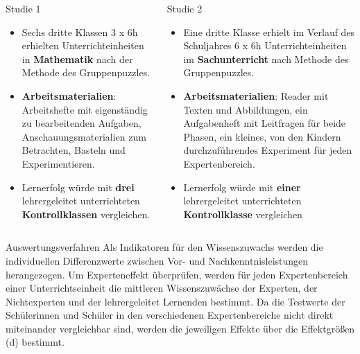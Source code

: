 \begin{columns}[t,totalwidth=\twocolwid]

\begin{column}{\onecolwid}\vspace{-.6in}
\begin{block}{Studie 1}
\begin{itemize}
\justifying
\item Sechs dritte Klassen 3 x 6h erhielten Unterrichteinheiten in \textbf{Mathematik} nach der Methode des Gruppenpuzzles.
\item \textbf{Arbeitsmaterialien}: Arbeitshefte mit eigenständig zu bearbeitenden Aufgaben, Anschauungsmaterialien zum Betrachten, Basteln und Experimentieren.
\item Lernerfolg würde mit \textbf{drei} lehrergeleitet unterrichteten \textbf{Kontrollklassen} vergleichen.
\end{itemize}
\end{block}
\end{column}

\begin{column}{\onecolwid}\vspace{-.6in}
\begin{block}{Studie 2}
\begin{itemize}
\justifying
\item Eine dritte Klasse erhielt im Verlauf des Schuljahres 6 x 6h Unterrichteinheiten im \textbf{Sachunterricht} nach Methode des Gruppenpuzzles. 
\item \textbf{Arbeitsmaterialien}: Reader mit Texten und Abbildungen, ein Aufgabenheft mit Leitfragen für beide Phasen, ein kleines, von den Kindern durchzuführendes  Experiment für jeden Expertenbereich.
\item Lernerfolg würde mit \textbf{einer} lehrergeleitet unterrichteten \textbf{Kontrollklasse} vergleichen
\end{itemize}
\end{block}
\end{column}

\end{columns}

\begin{block}{Auswertungsverfahren}
Als Indikatoren für den Wissenszuwachs werden die individuellen Differenzwerte zwischen Vor- und Nachkenntnisleistungen herangezogen. Um Experteneffekt überprüfen, werden für jeden Expertenbereich einer Unterrichtseinheit die mittleren Wissenszuwächse der Experten, der Nichtexperten und der lehrergeleitet Lernenden bestimmt. Da die Testwerte der Schülerinnen und Schüler in den verschiedenen Expertenbereiche nicht direkt miteinander vergleichbar sind, werden die jeweiligen Effekte über die Effektgrößen (d) bestimmt.
\end{block} 

